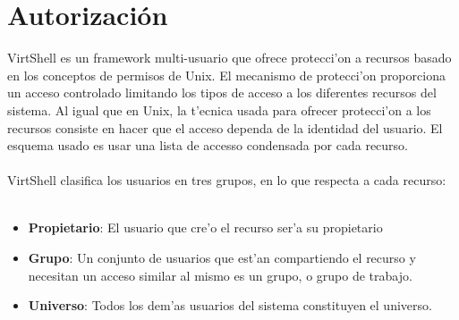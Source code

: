 \normalsize
\section{Autorización}

VirtShell es un framework multi-usuario que ofrece protecci'on a recursos basado en los conceptos de permisos de Unix. El mecanismo de protecci'on proporciona un acceso controlado limitando los tipos de acceso a los diferentes recursos del sistema. Al igual que en Unix, la t'ecnica usada para ofrecer protecci'on a los recursos consiste en hacer que el acceso dependa de la identidad del usuario. El esquema usado es usar una lista de accesso condensada por cada recurso.\\
\\
VirtShell clasifica los usuarios en tres grupos, en lo que respecta a cada recurso:\\
\\
\begin{itemize}
\item \textbf{Propietario}: El usuario que cre'o el recurso ser'a su propietario
\item \textbf{Grupo}: Un conjunto de usuarios que est'an compartiendo el recurso y necesitan un acceso similar al mismo es un grupo, o grupo de trabajo.
\item \textbf{Universo}: Todos los dem'as usuarios del sistema constituyen el universo.
\end{itemize}










